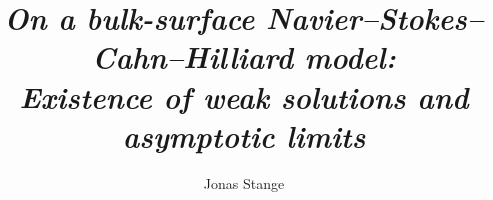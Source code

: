 \documentclass[11pt,reqno]{amsart}
\theoremstyle{remark}
\numberwithin{equation}{section}
\begin{document}
\title[On  bulk-surface NSCH model: Existence of weak solutions and asymptotic limits]
{\emph{On a bulk-surface Navier--Stokes--Cahn--Hilliard model: \\ Existence of weak solutions and asymptotic limits}}
\author[Jonas Stange]{Jonas Stange}



\address{Universit\"{a}t Regensburg \\ 
Fakult\"{a}t f\"{u}r Mathematik \\
Universit\"atsstr. 31, D-93053 Regensburg, Germany\\
\href{mailto:jonas.stange@ur.de}{jonas.stange@ur.de}
}




%

\end{document}
